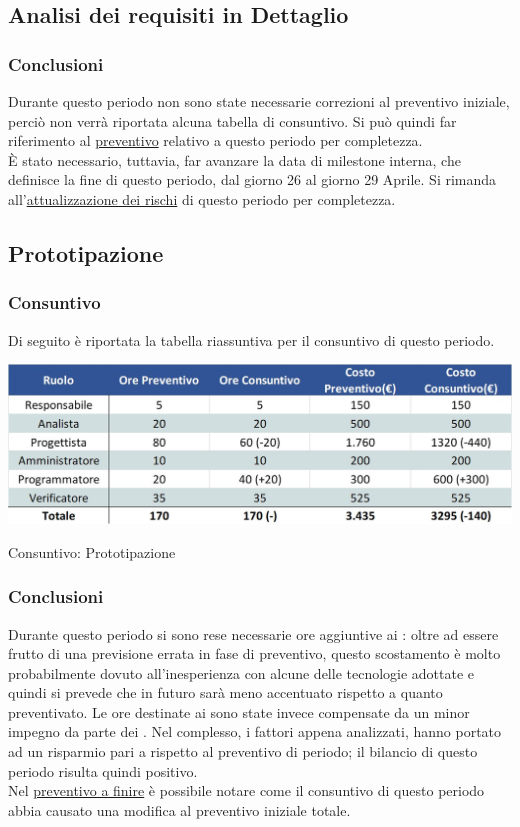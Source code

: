 \subsection{Analisi dei requisiti in Dettaglio}
\subsubsection{Conclusioni}
Durante questo periodo non sono state necessarie correzioni al preventivo iniziale, perciò non verrà riportata alcuna tabella di consuntivo. Si può quindi far riferimento al \hyperref[PreventivoAnalisiRequisitiDettaglio]{preventivo} relativo a questo periodo per completezza. \\
È stato necessario, tuttavia, far avanzare la data di milestone interna, che definisce la fine di questo periodo, dal giorno 26 al giorno 29 Aprile. Si rimanda all'\hyperref[RiscontroAnalisiDettaglio]{attualizzazione dei rischi} di questo periodo per completezza.

\newpage
\subsection{Prototipazione}
\subsubsection{Consuntivo}
Di seguito è riportata la tabella riassuntiva per il consuntivo di questo periodo.
\begin{table}[h!]
	\centerline{\includegraphics[scale=0.55]{img/Preventivo/Consuntivo/PrototipazioneConsuntivo.jpg}}
	\caption{Consuntivo: Prototipazione}
\end{table}
\subsubsection{Conclusioni}
Durante questo periodo si sono rese necessarie ore aggiuntive ai \progrs{}: oltre ad essere frutto di una previsione errata in fase di preventivo, questo scostamento è molto probabilmente dovuto all'inesperienza con alcune delle tecnologie adottate e quindi si prevede che in futuro sarà meno accentuato rispetto a quanto preventivato. Le ore destinate ai \progrs{} sono state invece compensate da un minor impegno da parte dei \progs{}. Nel complesso, i fattori appena analizzati, hanno portato ad un risparmio pari a  rispetto al preventivo di periodo; il bilancio di questo periodo risulta quindi positivo. \\ 
Nel \hyperref[PreventivoFinire]{preventivo a finire} è possibile notare come il consuntivo di questo periodo abbia causato una modifica al preventivo iniziale totale.

